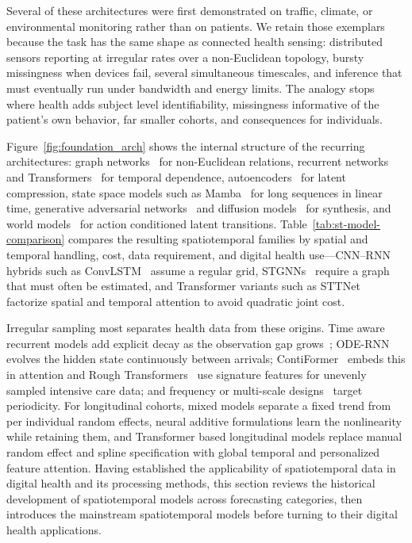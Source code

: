 \documentclass[journal]{IEEEtran}
\begin{document}
Several of these architectures were first demonstrated on traffic, climate, or environmental monitoring rather than on patients. We retain those exemplars because the task has the same shape as connected health sensing: distributed sensors reporting at irregular rates over a non-Euclidean topology, bursty missingness when devices fail, several simultaneous timescales, and inference that must eventually run under bandwidth and energy limits. The analogy stops where health adds subject level identifiability, missingness informative of the patient's own behavior, far smaller cohorts, and consequences for individuals.

Figure~\ref{fig:foundation_arch} shows the internal structure of the recurring architectures: graph networks~\cite{scarselli2009gnn} for non-Euclidean relations, recurrent networks~\cite{rumelhart1986rnn} and Transformers~\cite{vaswani2017attention} for temporal dependence, autoencoders~\cite{hinton2006reducing} for latent compression, state space models such as Mamba~\cite{gu2023mamba} for long sequences in linear time, generative adversarial networks~\cite{goodfellow2014gan} and diffusion models~\cite{ho2020ddpm} for synthesis, and world models~\cite{maes2026leworldmodel} for action conditioned latent transitions. Table~\ref{tab:st-model-comparison} compares the resulting spatiotemporal families by spatial and temporal handling, cost, data requirement, and digital health use---CNN--RNN hybrids such as ConvLSTM~\cite{shi2015convolutional} assume a regular grid, STGNNs~\cite{shao2022longterm} require a graph that must often be estimated, and Transformer variants such as STTNet~\cite{xu2020stransformer} factorize spatial and temporal attention to avoid quadratic joint cost.

Irregular sampling most separates health data from these origins. Time aware recurrent models add explicit decay as the observation gap grows~\cite{metzger2023crop}; ODE-RNN~\cite{rubanova2019latent} evolves the hidden state continuously between arrivals; ContiFormer~\cite{chen2023contiformer} embeds this in attention and Rough Transformers~\cite{morenopino2024rough} use signature features for unevenly sampled intensive care data; and frequency or multi-scale designs~\cite{zhou2022fedformer,wang2023micn} target periodicity. For longitudinal cohorts, mixed models separate a fixed trend from per individual random effects, neural additive formulations learn the nonlinearity while retaining them, and Transformer based longitudinal models replace manual random effect and spline specification with global temporal and personalized feature attention.
\else
Having established the applicability of spatiotemporal data in digital health and its processing methods, this section reviews the historical development of spatiotemporal models across forecasting categories, then introduces the mainstream spatiotemporal models before turning to their digital health applications.
\end{document}

